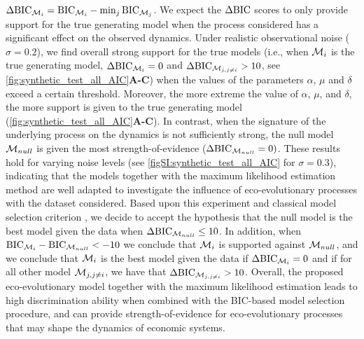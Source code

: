 %
$\Delta \text{BIC}_{\mathcal{M}_i} = \text{BIC}_{\mathcal{M}_i} - \min_{j} \text{BIC}_{\mathcal{M}_j}$. 
%
We expect the $\Delta \text{BIC}$ scores to only provide support for the true generating model when the process considered has a significant effect on the observed dynamics.
Under realistic observational noise ($\sigma = 0.2$), we find overall strong support for the true models (i.e., when $\mathcal{M}_i$ is the true generating model, $\Delta\text{BIC}_{\mathcal{M}_{i}} = 0$ and $\Delta\text{BIC}_{\mathcal{M}_{j,j\neq i}} > 10$, see \cref{fig:synthetic_test_all_AIC}\textbf{A-C}) when the values of the parameters $\alpha$, $\mu$ and $\delta$ exceed a certain threshold. 
% 
% 
% 
Moreover, the more extreme the value of $\alpha$, $\mu$, and $\delta$, the more support is given to the true generating model (\cref{fig:synthetic_test_all_AIC}\textbf{A-C}).
% 
In contrast, when the signature of the underlying process on the dynamics is not sufficiently strong, the null model $\mathcal{M}_{null}$ is given the most strength-of-evidence ($\Delta\text{BIC}_{\mathcal{M}_{null}} = 0)$.
% 
% 
These results hold for varying noise levels (see \cref{figSI:synthetic_test_all_AIC} for $\sigma = 0.3$), indicating that the models together with the maximum likelihood estimation method are well adapted to investigate the influence of eco-evolutionary processes with the dataset considered.
%
Based upon this experiment and classical model selection criterion \citep{Burnham2002}, we decide to accept the hypothesis that the null model is the best model given the data when $\Delta \text{BIC}_{\mathcal{M}_{null}} \leq 10$. In addition, when $\text{BIC}_{\mathcal{M}_i} - \text{BIC}_{\mathcal{M}_{null}} < -10$ we conclude that $\mathcal{M}_i$ is supported against $\mathcal{M}_{null}$, and we conclude that $\mathcal{M}_i$ is the best model given the data if $\Delta \text{BIC}_{\mathcal{M}_i} = 0 $ and if for all other model $\mathcal{M}_{j,j \neq i}$, we have that $\Delta \text{BIC}_{\mathcal{M}_{j,j \neq i}} > 10$.
Overall, the proposed eco-evolutionary model together with the maximum likelihood estimation leads to high discrimination ability when combined with the BIC-based model selection procedure, and can provide strength-of-evidence for eco-evolutionary processes that may shape the dynamics of economic systems.

